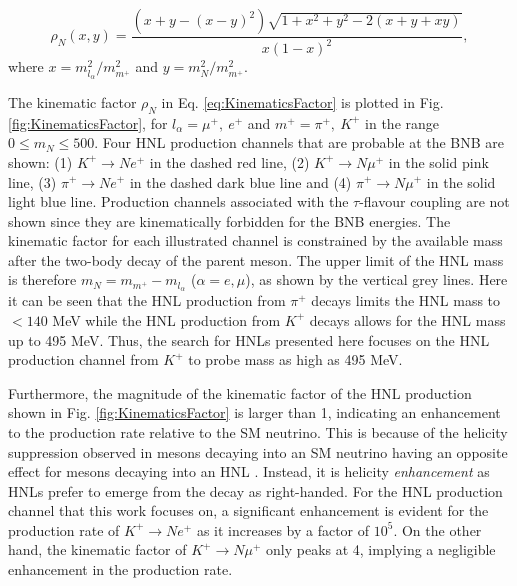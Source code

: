 \begin{equation}
	\rho_{N}(x,y) = \frac{(x+y-(x-y)^{2})\sqrt{1+x^{2}+y^{2}-2(x+y+xy)}}{x(1-x)^{2}},
\label{eq:KinematicsFactor}
\end{equation}
where $x = m^{2}_{l_{\alpha}}/m^{2}_{m^+}$ and $y=m^{2}_{N}/m^{2}_{m^+}$.

The kinematic factor $\rho_N$ in Eq. \ref{eq:KinematicsFactor} is plotted in Fig. \ref{fig:KinematicsFactor}, for $l_{\alpha} = \mu^+,\ e^+$ and $m^+ = \pi^+,\ K^+$ in the range $0 \leq m_N \leq 500$.
Four HNL production channels that are probable at the BNB are shown: (1) $K^+ \rightarrow Ne^+$ in the dashed red line, (2) $K^+ \rightarrow N\mu^+$ in the solid pink line, (3) $\pi^+ \rightarrow Ne^
+$ in the dashed dark blue line and (4) $\pi^+ \rightarrow N\mu^+$ in the solid light blue line.  
Production channels associated with the $\tau$-flavour coupling are not shown since they are kinematically forbidden for the BNB energies.
The kinematic factor for each illustrated channel is constrained by the available mass after the two-body decay of the parent meson.
The upper limit of the HNL mass is therefore $m_{N} = m_{m^+} - m_{l_{\alpha}}$ ($\alpha=e,\mu$), as shown by the vertical grey lines.
Here it can be seen that the HNL production from $\pi^+$ decays limits the HNL mass to $< 140$ MeV while the HNL production from $K^+$ decays allows for the HNL mass up to 495 MeV. 
Thus, the search for HNLs presented here focuses on the HNL production channel from $K^+$ to probe mass as high as 495 MeV.



Furthermore, the magnitude of the kinematic factor of the HNL production shown in Fig. \ref{fig:KinematicsFactor} is larger than 1, indicating an enhancement to the production rate relative to the SM neutrino.
This is because of the helicity suppression observed in mesons decaying into an SM neutrino having an opposite effect for mesons decaying into an HNL \cite{HNLKelly}.
Instead, it is helicity \textit{enhancement} as HNLs prefer to emerge from the decay as right-handed.
For the HNL production channel that this work focuses on, a significant enhancement is evident for the production rate of $K^+\rightarrow  N e^+$ as it increases by a factor of $10^{5}$.
On the other hand, the kinematic factor of $K^+ \rightarrow N \mu^+ $ only peaks at 4, implying a negligible enhancement in the production rate.

